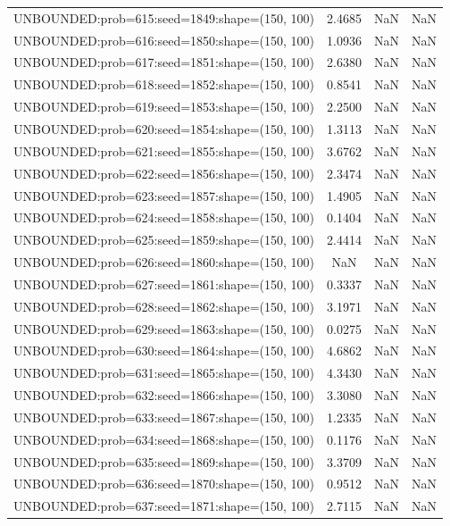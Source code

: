 \begin{longtable}{lccc}
UNBOUNDED:prob=615:seed=1849:shape=(150, 100) &  2.4685 &   NaN &    NaN \\
UNBOUNDED:prob=616:seed=1850:shape=(150, 100) &  1.0936 &   NaN &    NaN \\
UNBOUNDED:prob=617:seed=1851:shape=(150, 100) &  2.6380 &   NaN &    NaN \\
UNBOUNDED:prob=618:seed=1852:shape=(150, 100) &  0.8541 &   NaN &    NaN \\
UNBOUNDED:prob=619:seed=1853:shape=(150, 100) &  2.2500 &   NaN &    NaN \\
UNBOUNDED:prob=620:seed=1854:shape=(150, 100) &  1.3113 &   NaN &    NaN \\
UNBOUNDED:prob=621:seed=1855:shape=(150, 100) &  3.6762 &   NaN &    NaN \\
UNBOUNDED:prob=622:seed=1856:shape=(150, 100) &  2.3474 &   NaN &    NaN \\
UNBOUNDED:prob=623:seed=1857:shape=(150, 100) &  1.4905 &   NaN &    NaN \\
UNBOUNDED:prob=624:seed=1858:shape=(150, 100) &  0.1404 &   NaN &    NaN \\
UNBOUNDED:prob=625:seed=1859:shape=(150, 100) &  2.4414 &   NaN &    NaN \\
UNBOUNDED:prob=626:seed=1860:shape=(150, 100) &     NaN &   NaN &    NaN \\
UNBOUNDED:prob=627:seed=1861:shape=(150, 100) &  0.3337 &   NaN &    NaN \\
UNBOUNDED:prob=628:seed=1862:shape=(150, 100) &  3.1971 &   NaN &    NaN \\
UNBOUNDED:prob=629:seed=1863:shape=(150, 100) &  0.0275 &   NaN &    NaN \\
UNBOUNDED:prob=630:seed=1864:shape=(150, 100) &  4.6862 &   NaN &    NaN \\
UNBOUNDED:prob=631:seed=1865:shape=(150, 100) &  4.3430 &   NaN &    NaN \\
UNBOUNDED:prob=632:seed=1866:shape=(150, 100) &  3.3080 &   NaN &    NaN \\
UNBOUNDED:prob=633:seed=1867:shape=(150, 100) &  1.2335 &   NaN &    NaN \\
UNBOUNDED:prob=634:seed=1868:shape=(150, 100) &  0.1176 &   NaN &    NaN \\
UNBOUNDED:prob=635:seed=1869:shape=(150, 100) &  3.3709 &   NaN &    NaN \\
UNBOUNDED:prob=636:seed=1870:shape=(150, 100) &  0.9512 &   NaN &    NaN \\
UNBOUNDED:prob=637:seed=1871:shape=(150, 100) &  2.7115 &   NaN &    NaN \\

\end{longtable}
